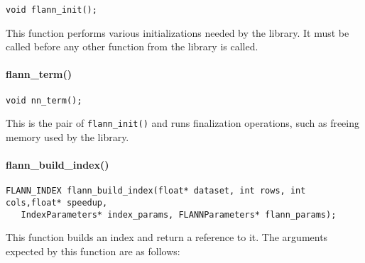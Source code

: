 \documentclass[letter,10pt]{article}
\begin{document}
\begin{Verbatim}[fontsize=\footnotesize,frame=single]
void flann_init();
\end{Verbatim}
This function performs various initializations needed by the library. It
must be called before any other function from the library is called.

\paragraph{flann\_term()}
\begin{Verbatim}[fontsize=\footnotesize,frame=single]
void nn_term();
\end{Verbatim}
This is the pair of \texttt{flann\_init()} and runs finalization
operations, such as freeing memory used by the library.


\paragraph{flann\_build\_index()}
\begin{Verbatim}[fontsize=\footnotesize,frame=single]
FLANN_INDEX flann_build_index(float* dataset, int rows, int cols,float* speedup,
   IndexParameters* index_params, FLANNParameters* flann_params);
\end{Verbatim}
This function builds an index and return a reference to it. The arguments
expected by this function are as follows:
\end{document}
